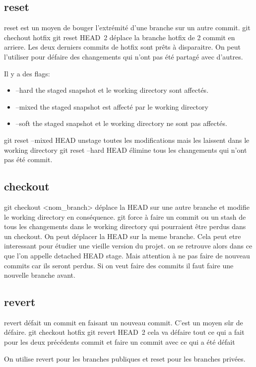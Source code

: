 \documentclass[12pt,a4paper]{article}
\begin{document}
\subsection{reset}
reset est un moyen de bouger l'extrémité d'une branche sur un autre commit.
git chechout hotfix
git reset HEAD~2 
déplace la branche hotfix de 2 commit en arriere.
Les deux derniers commits de hotfix sont prêts à disparaitre. 
On peut l'utiliser pour défaire des changements qui n'ont pas été partagé avec d'autres.

Il y a des flags:
\begin{itemize}
\item  --hard the staged snapshot et le working directory sont affectés.
\item --mixed the staged snapshot est affecté par le working directory
\item --soft the staged snapshot et le working directory ne sont  pas affectés.
\end{itemize}

git reset --mixed HEAD unstage toutes les modifications mais les laissent dans le working directory
git reset --hard HEAD élimine tous les changements qui n'ont pas été commit.

\subsection{checkout}
git checkout <nom_branch> déplace la HEAD sur une autre branche et modifie le working directory en conséquence. git force à faire un commit ou un stash de tous les changements dans le working directory qui pourraient être perdus dans un checkout.
On peut déplacer la HEAD sur la meme branche. Cela peut etre interessant pour étudier une vieille version du projet. on se retrouve alors dans ce que l'on appelle detached HEAD stage. Mais attention à ne pas faire de nouveau commits car ils seront perdus. Si on veut faire des commits il faut faire une nouvelle branche avant.

\subsection{revert}
revert défait un commit en faisant un nouveau commit. C'est un moyen sûr de défaire. 
git checkout hotfix
git revert  HEAD~2
cela va défaire tout ce qui a fait pour les deux précédents commit et faire un commit avec ce  qui a été défait

On utilise revert pour les branches publiques et reset pour les branches privées.
\end{document}
